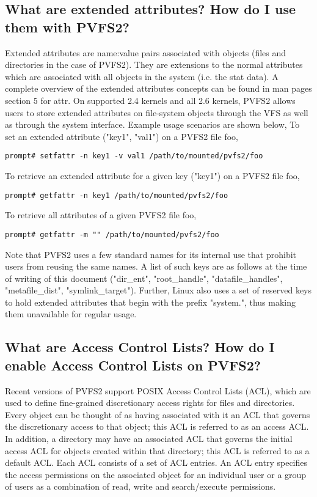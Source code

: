 \documentclass[11pt,letterpaper]{article}
\begin{document}
\subsection{What are extended attributes? How do I use them with PVFS2?}
Extended attributes are name:value pairs associated with objects (files and directories
in the case of PVFS2). They are extensions to the
normal attributes which are associated with all objects in the system (i.e. the stat data).
A complete overview of the extended attributes concepts can be found in man pages section 5 for attr.
On supported 2.4 kernels and all 2.6 kernels, PVFS2 allows users to store extended attributes
on file-system objects through the VFS as well as through the system interface. Example
usage scenarios are shown below,
To set an extended attribute ("key1", "val1") on a PVFS2 file foo,
\begin{verbatim}
prompt# setfattr -n key1 -v val1 /path/to/mounted/pvfs2/foo
\end{verbatim}
To retrieve an extended attribute for a given key ("key1") on a PVFS2 file foo,
\begin{verbatim}
prompt# getfattr -n key1 /path/to/mounted/pvfs2/foo
\end{verbatim}
To retrieve all attributes of a given PVFS2 file foo,
\begin{verbatim}
prompt# getfattr -m "" /path/to/mounted/pvfs2/foo
\end{verbatim}
Note that PVFS2 uses a few standard names for its internal use that prohibit users
from reusing the same names. A list of such keys are as follows at the time
of writing of this document ("dir\_ent", "root\_handle",
"datafile\_handles", "metafile\_dist", "symlink\_target"). Further, Linux also uses
a set of reserved keys to hold extended attributes that begin with the prefix "system.",
thus making them unavailable for regular usage.

\subsection{What are Access Control Lists? How do I enable Access Control Lists on PVFS2?}
Recent versions of PVFS2 support POSIX Access Control Lists (ACL), which are used to define fine-grained 
discretionary access rights for files and directories. Every object can be thought of as having 
associated with it an ACL that governs the discretionary access to that object; this ACL
is referred to as an access ACL. In addition, a directory may have an associated ACL that 
governs the initial access ACL for objects created within that directory; this ACL 
is referred to as a default ACL. Each ACL consists of a set of ACL entries. An ACL entry 
specifies the access permissions on the associated object for an individual user or a group 
of users as a combination of read, write and search/execute permissions.
\end{document}
